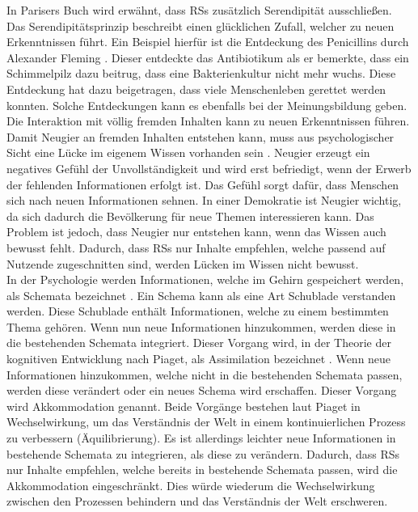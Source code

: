 In Parisers Buch wird erwähnt, dass \acp{RS} zusätzlich Serendipität ausschließen.
Das Serendipitätsprinzip beschreibt einen \glqq glücklichen\grqq{} Zufall, welcher zu neuen Erkenntnissen führt.
Ein Beispiel hierfür ist die Entdeckung des Penicillins durch Alexander Fleming \cite{penicilin}.
Dieser entdeckte das Antibiotikum als er bemerkte, dass ein Schimmelpilz dazu beitrug, dass eine Bakterienkultur nicht mehr wuchs.
Diese Entdeckung hat dazu beigetragen, dass viele Menschenleben gerettet werden konnten.
Solche Entdeckungen kann es ebenfalls bei der Meinungsbildung geben.
Die Interaktion mit völlig fremden Inhalten kann zu neuen Erkenntnissen führen. \\

Damit Neugier an fremden Inhalten entstehen kann, muss aus psychologischer Sicht eine Lücke im eigenem Wissen vorhanden sein \cite{handbook-emotion-curiosity}.
Neugier erzeugt ein negatives Gefühl der Unvollständigkeit und wird erst befriedigt, wenn der Erwerb der fehlenden Informationen erfolgt ist.
Das Gefühl sorgt dafür, dass Menschen sich nach neuen Informationen sehnen.
In einer Demokratie ist Neugier wichtig, da sich dadurch die Bevölkerung für neue Themen interessieren kann.
Das Problem ist jedoch, dass Neugier nur entstehen kann, wenn das Wissen auch bewusst fehlt.
Dadurch, dass \acp{RS} nur Inhalte empfehlen, welche passend auf Nutzende zugeschnitten sind, werden Lücken im Wissen nicht bewusst. \\

In der Psychologie werden Informationen, welche im Gehirn gespeichert werden, als Schemata bezeichnet \cite{schema}.
Ein Schema kann als eine Art Schublade verstanden werden.
Diese Schublade enthält Informationen, welche zu einem bestimmten Thema gehören.
Wenn nun neue Informationen hinzukommen, werden diese in die bestehenden Schemata integriert.
Dieser Vorgang wird, in der Theorie der kognitiven Entwicklung nach Piaget, als Assimilation bezeichnet \cite{piaget}.
Wenn neue Informationen hinzukommen, welche nicht in die bestehenden Schemata passen, werden diese verändert oder ein neues Schema wird erschaffen.
Dieser Vorgang wird Akkommodation genannt.
Beide Vorgänge bestehen laut Piaget in Wechselwirkung, um das Verständnis der Welt in einem kontinuierlichen Prozess zu verbessern (Äquilibrierung).
Es ist allerdings leichter neue Informationen in bestehende Schemata zu integrieren, als diese zu verändern.
Dadurch, dass \acp{RS} nur Inhalte empfehlen, welche bereits in bestehende Schemata passen, wird die Akkommodation eingeschränkt.
Dies würde wiederum die Wechselwirkung zwischen den Prozessen behindern und das Verständnis der Welt erschweren. \\

